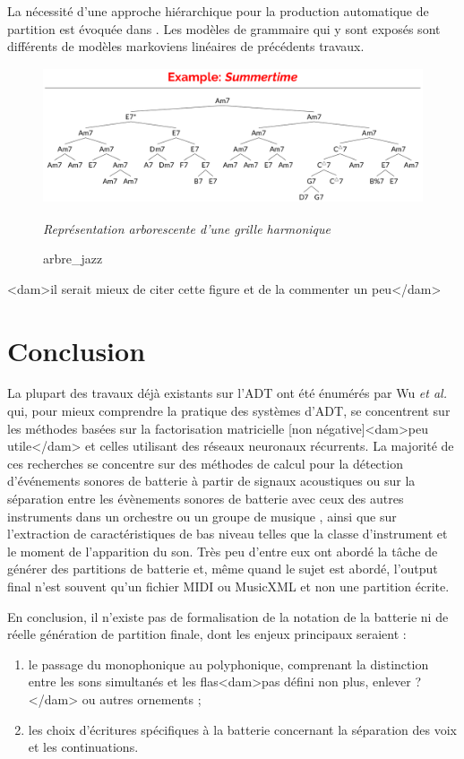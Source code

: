 La nécessité d’une approche hiérarchique pour la production automatique de
partition est évoquée dans \cite{foscarin:hal-01988990}. 
Les modèles de grammaire qui y sont exposés sont différents de modèles
markoviens linéaires de précédents travaux.\newpage
\begin{figure}[h]
	\centering
	\includegraphics[height=40mm, width=120mm]{z_images/2_etat_de_l_art/1_summertime_tree.png}
	\caption{arbre\_jazz}
	\textit{Représentation arborescente d’une grille harmonique} \cite{harasimjazz}
\end{figure}
<dam>il serait mieux de citer cette figure et de la commenter un peu</dam>
\section*{Conclusion}
La plupart des travaux déjà existants sur l’ADT ont été énumérés par Wu
\textit{et al.} \cite{Review_ADT} qui, pour mieux comprendre la pratique des
systèmes d’ADT, se concentrent sur les méthodes basées sur la factorisation
matricielle [non négative]<dam>peu utile</dam> et celles utilisant des réseaux
neuronaux récurrents. La majorité de ces recherches se concentre sur des
méthodes de calcul pour la détection d'événements sonores de batterie à partir
de signaux acoustiques ou sur la séparation entre les évènements sonores de
batterie avec ceux des autres instruments dans un orchestre ou un groupe de
musique \cite{2802}, ainsi que sur l'extraction de caractéristiques de bas
niveau telles que la classe d'instrument et le moment de l'apparition du son. 
Très peu d'entre eux ont abordé la tâche de générer des partitions de batterie
et, même quand le sujet est abordé, l’output final n’est souvent qu’un fichier
MIDI ou MusicXML et non une partition écrite. 

En conclusion, il n’existe pas de formalisation de la notation de la batterie
ni de réelle génération de partition finale, dont les enjeux principaux
seraient :
\begin{enumerate}
    \item le passage du monophonique au polyphonique, comprenant la distinction
        entre les sons simultanés et les flas<dam>pas défini non plus, enlever
        ?</dam> ou autres ornements ;
    \item les choix d’écritures spécifiques à la batterie concernant la
        séparation des voix et les continuations.
\end{enumerate}
